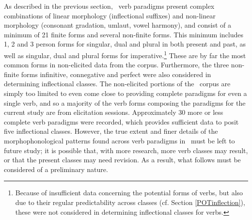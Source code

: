 As described in the previous section, \PS\ verb paradigms present complex combinations of linear morphology (inflectional suffixes) and non-linear morphology (consonant gradation, umlaut, vowel harmony), and consist of a minimum of 21 finite forms and several non-finite forms. This minimum includes 1, 2 and 3 person forms for singular, dual and plural in both present and past, as well as singular, dual and plural forms for imperative.\footnote{Because of insufficient data concerning the potential forms of verbs, but also due to their regular predictability across classes (cf. Section \ref{POTinflection}), these were not considered in determining inflectional classes for verbs.} 
These are by far the most common forms in non-elicited data from the corpus. Furthermore, the three non-finite forms infinitive, connegative and perfect were also considered in determining inflectional classes. %
The non-elicited portions of the \PSDP\ corpus are simply too limited to even come close to providing complete paradigms for even a single verb, and so a majority of the verb forms composing the paradigms for the current study are from elicitation sessions. Approximately 30 more or less complete verb paradigms were recorded, which provides sufficient data to posit five inflectional classes. However, the true extent and finer details of the morphophonological patterns found across verb paradigms in \PS\ must be left to future study; it is possible that, with more research, more verb classes may result, or that the present classes may need revision. As a result, what follows must be considered of a preliminary nature. 


